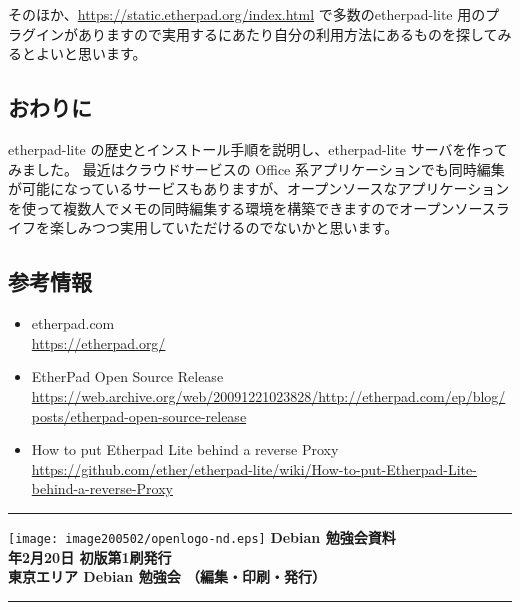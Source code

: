 \documentclass[mingoth,a4paper]{jsarticle}
\newcommand{\debmtgyear}{2021}
\newcommand{\debmtgmonth}{2}
\newcommand{\debmtgdate}{20}
\begin{document}
そのほか、\url{https://static.etherpad.org/index.html} で多数のetherpad-lite 用のプラグインがありますので実用するにあたり自分の利用方法にあるものを探してみるとよいと思います。

\subsection{おわりに}

etherpad-lite の歴史とインストール手順を説明し、etherpad-lite サーバを作ってみました。
最近はクラウドサービスの Office 系アプリケーションでも同時編集が可能になっているサービスもありますが、オープンソースなアプリケーションを使って複数人でメモの同時編集する環境を構築できますのでオープンソースライフを楽しみつつ実用していただけるのでないかと思います。


\subsection{参考情報}

\begin{itemize}
\item etherpad.com \\ \url{https://etherpad.org/}
\item EtherPad Open Source Release \\ \url{https://web.archive.org/web/20091221023828/http://etherpad.com/ep/blog/posts/etherpad-open-source-release}
\item How to put Etherpad Lite behind a reverse Proxy \\ \url{https://github.com/ether/etherpad-lite/wiki/How-to-put-Etherpad-Lite-behind-a-reverse-Proxy}
\end{itemize}


\mbox{}\newpage
\mbox{}\newpage

\vspace*{15cm}
\hrule
\vspace{2mm}
\texttt{[image: image200502/openlogo-nd.eps]}
\noindent \Large \bf Debian 勉強会資料\\
\noindent \normalfont \debmtgyear{}年\debmtgmonth{}月\debmtgdate{}日 \hspace{5mm}  初版第1刷発行\\
\noindent \normalfont 東京エリア Debian 勉強会 （編集・印刷・発行）\\
\hrule
\end{document}
